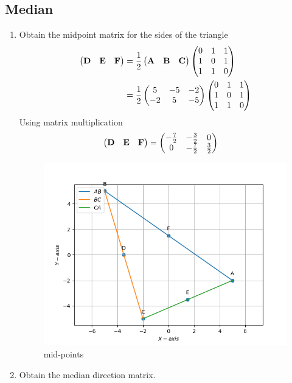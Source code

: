 \documentclass[10pt]{book}
\begin{document}
\subsection{Median}
\begin{enumerate}[label=\thesubsection.\arabic*.,ref=\thesubsection.\theenumi]
\item Obtain the midpoint matrix for the sides of the triangle \\
\solution
\begin{align}
\begin{pmatrix}\mathbf{D} & \mathbf{E} &\mathbf{F}\end{pmatrix} &= \frac{1}{2}\begin{pmatrix}\mathbf{A} & \mathbf{B} &\mathbf{C}\end{pmatrix}
\begin{pmatrix}0 & 1 & 1 \\ 1 & 0 & 1 \\ 1 & 1 & 0\end{pmatrix} \\
&= \frac{1}{2}\begin{pmatrix}5 & -5 & -2 \\ -2 & 5 & -5\end{pmatrix}\begin{pmatrix}0 & 1 & 1 \\ 1 & 0 & 1 \\ 1 & 1 & 0\end{pmatrix}
\end{align}
Using matrix multiplication 
\begin{align}
    \begin{pmatrix}\mathbf{D} & \mathbf{E} &\mathbf{F}\end{pmatrix} &= \begin{pmatrix}-\frac{7}{2} & -\frac{3}{2} & 0 \\ 0 & -\frac{7}{2} & \frac{3}{2}\end{pmatrix}
\end{align}
\begin{figure}[H]
    \centering
   \includegraphics{figs/DEF_midpoints.png}
    \caption{mid-points}
    \label{fig:DEF_midpoints}
\end{figure}
\item Obtain the median direction matrix. \\

\end{enumerate}
\end{document}
